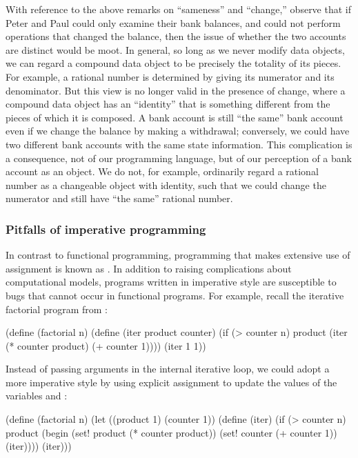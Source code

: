 With reference to the above remarks on ``sameness'' and ``change,'' observe
that if Peter and Paul could only examine their bank balances, and could not
perform operations that changed the balance, then the issue of whether the two
accounts are distinct would be moot.  In general, so long as we never modify
data objects, we can regard a compound data object to be precisely the totality
of its pieces.  For example, a rational number is determined by giving its
numerator and its denominator.  But this view is no longer valid in the
presence of change, where a compound data object has an ``identity'' that is
something different from the pieces of which it is composed.  A bank account is
still ``the same'' bank account even if we change the balance by making a
withdrawal; conversely, we could have two different bank accounts with the same
state information.  This complication is a consequence, not of our programming
language, but of our perception of a bank account as an object.  We do not, for
example, ordinarily regard a rational number as a changeable object with
identity, such that we could change the numerator and still have ``the same''
rational number.

\subsubsection*{Pitfalls of imperative programming}

In contrast to functional programming, programming that makes extensive use of
assignment is known as .  In addition to
raising complications about computational models, programs written in
imperative style are susceptible to bugs that cannot occur in functional
programs.  For example, recall the iterative factorial program from
:

\begin{codeBlock}
(define (factorial n)
  (define (iter product counter)
    (if (> counter n)
        product
        (iter (* counter product) (+ counter 1))))
  (iter 1 1))
\end{codeBlock}

\noindent
Instead of passing arguments in the internal iterative loop, we could adopt a
more imperative style by using explicit assignment to update the values of the
variables  and :

\begin{codeBlock}
(define (factorial n)
  (let ((product 1)
        (counter 1))
    (define (iter)
      (if (> counter n)
          product
          (begin (set! product (* counter product))
                 (set! counter (+ counter 1))
                 (iter))))
    (iter)))
\end{codeBlock}

